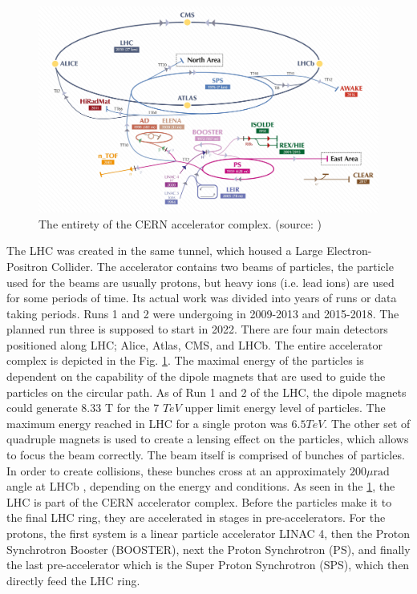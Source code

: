 \begin{figure}
  \centering
  \includegraphics[width=0.9\linewidth]{figures/chapter2/CERN_accelerator_complex.jpeg}
  \caption{The entirety of the CERN accelerator complex. (source: \cite{VandenBroeck:2693837})}
  \label{fig:cern_complex}
\end{figure}

The LHC was created in the same tunnel, which housed a Large Electron-Positron Collider.
The accelerator contains two beams of particles, the particle used for the beams are usually protons, but heavy ions (i.e. lead ions) are used for some periods of time.
Its actual work was divided into years of runs or data taking periods. Runs 1 and 2 were undergoing in 2009-2013 and 2015-2018. The planned run three is supposed to start in 2022.
There are four main detectors positioned along LHC; Alice, Atlas, CMS, and LHCb.
The entire accelerator complex is depicted in the Fig. \ref{fig:cern_complex}.
The maximal energy of the particles is dependent on the capability of the dipole magnets that are used to guide the particles on the circular path.
As of Run 1 and 2 of the LHC, the dipole magnets could generate 8.33 T  \cite{Evans_2008} for the 7 $TeV$ upper limit energy level of particles.
The maximum energy reached in LHC for a single proton was $6.5 TeV$.
The other set of quadruple magnets is used to create a lensing effect on the particles, which allows to focus the beam correctly.
The beam itself is comprised of bunches of particles.
In order to create collisions, these bunches cross at an approximately $200 \mu \text{rad}$ angle at LHCb \cite{Holzer:1541986}, depending on the energy and conditions.
As seen in the \ref{fig:cern_complex}, the LHC is part of the CERN accelerator complex.
Before the particles make it to the final LHC ring, they are accelerated in stages in pre-accelerators.
For the protons, the first system is a linear particle accelerator LINAC 4, then the Proton Synchrotron Booster (BOOSTER), next the Proton Synchrotron (PS), and finally the last pre-accelerator which is the Super Proton Synchrotron (SPS), which then directly feed the LHC ring.

